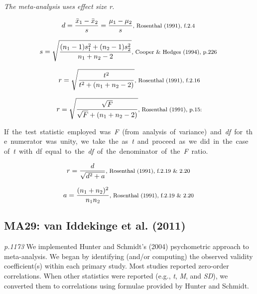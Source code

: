 \documentclass{article}
\begin{document}
\vspace{3mm}
\textit{The meta-analysis uses effect size r.}

\begin{equation*}
d={\frac {{\bar {x}}_{1}-{\bar {x}}_{2}}{s}}={\frac {\mu_{1}-\mu_{2}}{s}} \mbox{\footnotesize, Rosenthal (1991), f.2.4 } 
\end{equation*}

\begin{equation*}
s={\sqrt {\frac {(n_{1}-1)s_{1}^{2}+(n_{2}-1)s_{2}^{2}}{n_{1}+n_{2}-2}}} \mbox{\footnotesize, Cooper \& Hedges (1994), p.226 } 
\end{equation*}

\begin{equation*}
r=\sqrt{\frac{t^{2}}{t^{2}+(n_{1}+n_{2}-2)}} \mbox{\footnotesize, Rosenthal (1991), f.2.16}
\end{equation*}

\begin{equation*}
r=\sqrt{\frac{\sqrt{F}}{\sqrt{F}+(n_{1}+n_{2}-2)}} \mbox{\footnotesize, Rosenthal (1991), p.15:}
\end{equation*}

\mbox {\footnotesize If the test statistic employed was \textit{F} (from analysis of variance) and \textit{df} for the numerator was unity, we take the as \textit{t} and proceed as we did in the case of \textit{t} with df equal to the \textit{df} of the denominator of the \textit{F} ratio. }

\begin{equation*}
r=\frac{d}{\sqrt{d^{2}+a}} \mbox{\footnotesize, Rosenthal (1991), f.2.19 \& 2.20 }
\end{equation*}

\begin{equation*}
a=\frac{(n_{1}+n_{2})^{2}}{n_{1}n_{2}} \mbox{\footnotesize, Rosenthal (1991), f.2.19 \& 2.20 }
\end{equation*}

\subsection*{MA29: van Iddekinge et al. (2011)} 

\textit{p.1173} We implemented Hunter and Schmidt’s (2004) psychometric approach to meta-analysis. We began by identifying (and/or computing) the observed validity coefficient(s) within each primary study. Most studies reported zero-order correlations.
When other statistics were reported (e.g., \textit{t}, \textit{M}, and \textit{SD}), we converted them to correlations using formulae provided by Hunter and Schmidt.
\end{document}

